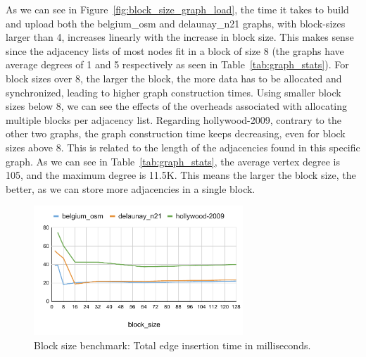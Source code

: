 As we can see in Figure~\ref{fig:block_size_graph_load}, the time it takes to build and upload both the belgium\_osm and delaunay\_n21 graphs, with block-sizes larger than 4, increases linearly with the increase in block size. This makes sense since the adjacency lists of most nodes fit in a block of size 8 (the graphs have average degrees of 1 and 5 respectively as seen in Table~\ref{tab:graph_stats}). For block sizes over 8, the larger the block, the more data has to be allocated and synchronized, leading to higher graph construction times. Using smaller block sizes below 8, we can see the effects of the overheads associated with allocating multiple blocks per adjacency list. Regarding hollywood-2009, contrary to the other two graphs, the graph construction time keeps decreasing, even for block sizes above 8. This is related to the length of the adjacencies found in this specific graph. As we can see in Table~\ref{tab:graph_stats}, the average vertex degree is 105, and the maximum degree is 11.5K. This means the larger the block size, the better, as we can store more adjacencies in a single block.

\begin{figure}
    \centering
    \includegraphics[width=0.7\textwidth]{Chapters/Figures/plots/block_size_edge_insertion.pdf}
    \caption{Block size benchmark: Total edge insertion time in milliseconds.}
    \label{fig:block_size_edge_insertion}
\end{figure}


